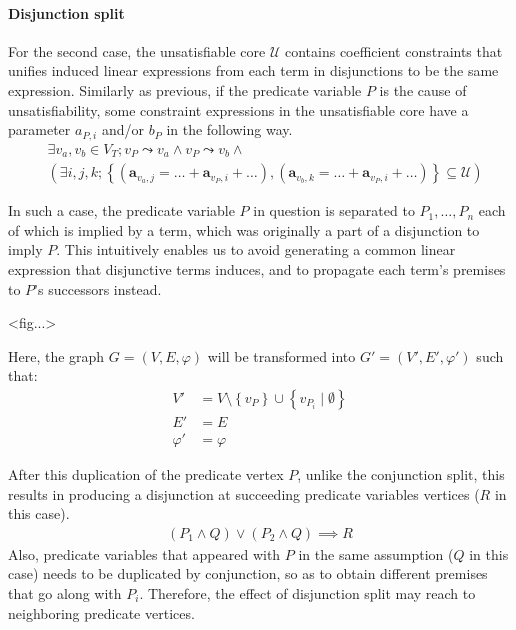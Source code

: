 \documentclass[a4paper,12pt]{article}
\begin{document}
\paragraph{Disjunction split}
For the second case, the unsatisfiable core $\mathcal{U}$ contains
coefficient constraints that unifies induced linear expressions from
each term in disjunctions to be the same expression.  Similarly as
previous, if the predicate variable $P$ is the cause of
unsatisfiability, some constraint expressions in the unsatisfiable
core have a parameter $a_{P,i}$ and/or $b_P$ in the following way.
\begin{align*}
& \exists v_a, v_b \in V_T; v_P \leadsto v_a \wedge v_P \leadsto v_b \wedge \\
& \left( \exists i, j, k;
\left\lbrace \left( \mathbf{a}_{v_a,j} = \ldots + \mathbf{a}_{v_P,i} + \ldots \right),
\left( \mathbf{a}_{v_b,k} = \ldots + \mathbf{a}_{v_P,i} + \ldots \right)
\right\rbrace \subseteq \mathcal{U} \right)
\end{align*}

In such a case, the predicate variable $P$ in question is separated to
$P_1, \ldots, P_n$ each of which is implied by a term, which was
originally a part of a disjunction to imply $P$.  This intuitively
enables us to avoid generating a common linear expression that
disjunctive terms induces, and to propagate each term's premises to
$P$'s successors instead.

<fig...>

Here, the graph $G=(V,E,\varphi)$ will be transformed into
$G'=(V',E',\varphi')$ such that:
\begin{align*}
V' & = V \setminus \left\lbrace v_P \right\rbrace \cup
  \left\lbrace v_{P_i} \mid \emptyset \right\rbrace \\
E' & = E \\
\varphi' & = \varphi
\end{align*}

After this duplication of the predicate vertex $P$, unlike the
conjunction split, this results in producing a disjunction at
succeeding predicate variables vertices ($R$ in this case).
\begin{align*}
(P_1 \wedge Q) \vee (P_2 \wedge Q) \implies R
\end{align*}
Also, predicate variables that appeared with $P$ in the same
assumption ($Q$ in this case) needs to be duplicated by conjunction,
so as to obtain different premises that go along with $P_i$.
Therefore, the effect of disjunction split may reach to neighboring
predicate vertices.
\end{document}
